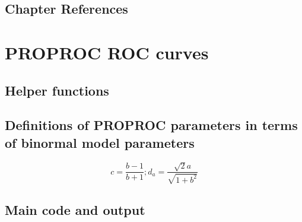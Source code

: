 \documentclass[
]{book}
\begin{document}
\hypertarget{proper-roc-models-references}{%
\section{Chapter References}\label{proper-roc-models-references}}

\hypertarget{proproc-rocs}{%
\chapter{PROPROC ROC curves}\label{proproc-rocs}}

\hypertarget{helper-functions}{%
\section{Helper functions}\label{helper-functions}}

\hypertarget{definitions-of-proproc-parameters-in-terms-of-binormal-model-parameters}{%
\section{Definitions of PROPROC parameters in terms of binormal model parameters}\label{definitions-of-proproc-parameters-in-terms-of-binormal-model-parameters}}

\[c=\frac{b-1}{b+1};{{d}_{a}}=\frac{\sqrt{2}a}{\sqrt{1+{{b}^{2}}}}\]

\hypertarget{main-code-and-output}{%
\section{Main code and output}\label{main-code-and-output}}
\end{document}
